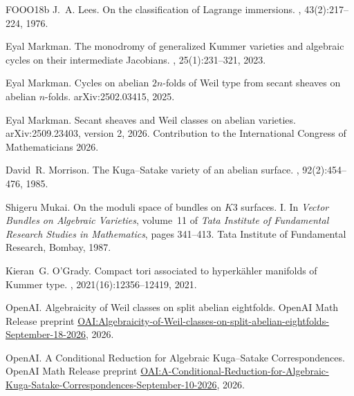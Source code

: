 \documentclass[11pt]{article}
\numberwithin{equation}{section}
\theoremstyle{definition}
\theoremstyle{remark}
\begin{document}
\begin{thebibliography}{FOOO18b}
J.~A. Lees.
\newblock On the classification of {Lagrange} immersions.
, 43(2):217--224, 1976.

Eyal Markman.
\newblock The monodromy of generalized {Kummer} varieties and algebraic cycles
  on their intermediate {Jacobians}.
, 25(1):231--321,
  2023.

Eyal Markman.
\newblock Cycles on abelian {$2n$}-folds of {Weil} type from secant sheaves on
  abelian {$n$}-folds.
\newblock arXiv:2502.03415, 2025.

Eyal Markman.
\newblock Secant sheaves and {Weil} classes on abelian varieties.
\newblock arXiv:2509.23403, version 2, 2026.
\newblock Contribution to the International Congress of Mathematicians 2026.

David~R. Morrison.
\newblock The {Kuga--Satake} variety of an abelian surface.
, 92(2):454--476, 1985.

Shigeru Mukai.
\newblock On the moduli space of bundles on {$K3$} surfaces. {I}.
\newblock In {\em Vector Bundles on Algebraic Varieties}, volume~11 of {\em
  Tata Institute of Fundamental Research Studies in Mathematics}, pages
  341--413. Tata Institute of Fundamental Research, Bombay, 1987.

Kieran~G. O'Grady.
\newblock Compact tori associated to hyperk{\"a}hler manifolds of {Kummer}
  type.
,
  2021(16):12356--12419, 2021.

OpenAI.
\newblock Algebraicity of Weil classes on split abelian eightfolds.
\newblock OpenAI Math Release preprint
\href{https://github.com/openai/math/blob/main/preprints/Algebraicity-of-Weil-classes-on-split-abelian-eightfolds-September-18-2026/paper.pdf}{OAI:Algebraicity-of-Weil-classes-on-split-abelian-eightfolds-September-18-2026},
2026.

OpenAI.
\newblock A Conditional Reduction for Algebraic Kuga--Satake Correspondences.
\newblock OpenAI Math Release preprint
\href{https://github.com/openai/math/blob/main/preprints/A-Conditional-Reduction-for-Algebraic-Kuga-Satake-Correspondences-September-10-2026/paper.pdf}{OAI:A-Conditional-Reduction-for-Algebraic-Kuga-Satake-Correspondences-September-10-2026},
2026.


\end{thebibliography}
\end{document}
